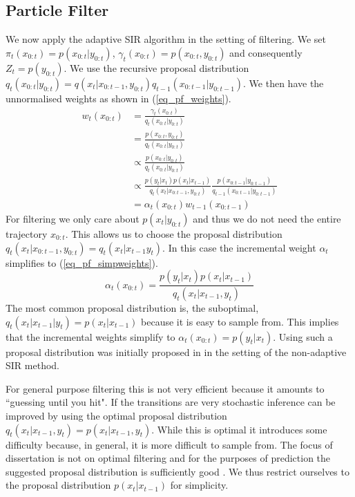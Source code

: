 \subsection{Particle Filter}
We now apply the adaptive SIR algorithm in the setting of filtering. We set $\pi_t(x_{0:t}) = p(x_{0:t}|y_{0:t})$, $\gamma_t(x_{0:t}) = p(x_{0:t}, y_{0:t})$ and consequently $Z_t = p(y_{0:t})$. We use the recursive proposal distribution $q_t(x_{0:t}|y_{0:t}) = q(x_t|x_{0:t-1}, y_{0:t})q_{t-1}(x_{0:t-1}|y_{0:t-1})$. We then have the unnormalised weights as shown in (\ref{eq_pf_weights}).
\begin{equation}
\begin{aligned}
w_t(x_{0:t}) &= \frac{\gamma_t(x_{0:t})}{q_t(x_{0:t}|y_{0:t})} \\
&= \frac{p(x_{0:t}, y_{0:t})}{q_t(x_{0:t}|y_{0:t})} \\
&\propto \frac{p(x_{0:t}| y_{0:t})}{q_t(x_{0:t}|y_{0:t})} \\
&\propto \frac{p(y_t|x_t)p(x_t|x_{t-1})}{q_t(x_t|x_{0:t-1}, y_{0:t})}\frac{p(x_{0:t-1}| y_{0:t-1})}{q_{t-1}(x_{0:t-1}|y_{0:t-1})} \\
&= \alpha_t(x_{0:t})w_{t-1}(x_{0:t-1})
\end{aligned}
\label{eq_pf_weights}
\end{equation}
For filtering we only care about $p(x_t|y_{0:t})$ and thus we do not need the entire trajectory $x_{0:t}$. This allows us to choose the proposal distribution $q_t(x_t|x_{0:t-1}, y_{0:t}) = q_t(x_{t}|x_{t-1}y_{t})$. In this case the incremental weight $\alpha_t$ simplifies to (\ref{eq_pf_simpweights}).
\begin{equation}
\alpha_t(x_{0:t}) = \frac{p(y_t|x_t)p(x_t|x_{t-1})}{q_t(x_t|x_{t-1}, y_{t})} 
\label{eq_pf_simpweights}
\end{equation}
The most common proposal distribution is, the suboptimal, $q_t(x_t|x_{t-1}|y_t) = p(x_t|x_{t-1})$ because it is easy to sample from. This implies that the incremental weights simplify to $\alpha_t(x_{0:t}) = p(y_t|x_t)$. Using such a proposal distribution was initially proposed in \cite{gordon} in the setting of the non-adaptive SIR method. 

For general purpose filtering this is not very efficient because it amounts to ``guessing until you hit". If the transitions are very stochastic inference can be improved by using the optimal proposal distribution $q_t(x_t|x_{t-1}, y_t) = p(x_t|x_{t-1}, y_t)$. While this is optimal it introduces some difficulty because, in general, it is more difficult to sample from. The focus of dissertation is not on optimal filtering and for the purposes of prediction the suggested proposal distribution is sufficiently good \cite{murphy1}. We thus restrict ourselves to the proposal distribution $p(x_t|x_{t-1})$ for simplicity.

